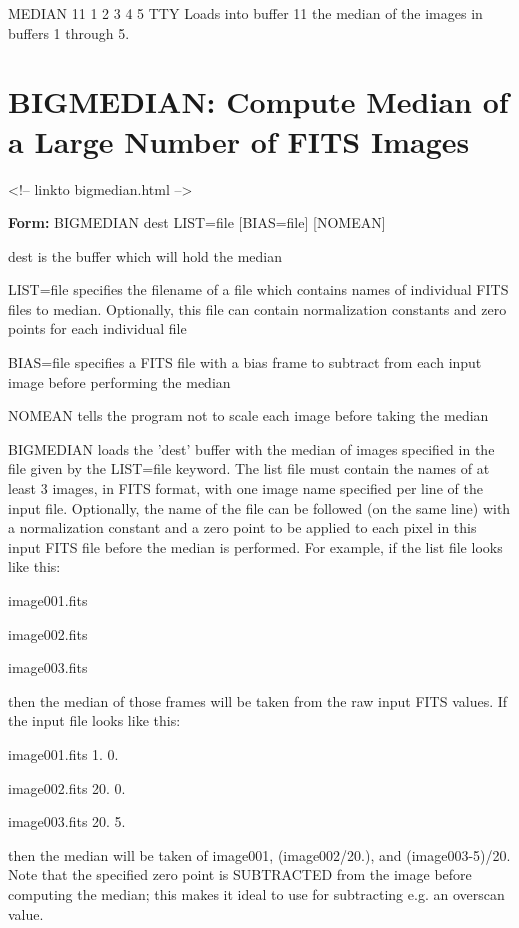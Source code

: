 \begin{example}
  \item[MEDIAN 11 1 2 3 4 5 TTY\hfill]{Loads into buffer 11 the median 
       of the images in buffers 1 through 5.}
\end{example}

\section{BIGMEDIAN: Compute Median of a Large Number of FITS Images}
\begin{rawhtml}
<!-- linkto bigmedian.html -->
\end{rawhtml}

\begin{command}
  \item[\textbf{Form: }BIGMEDIAN dest LIST=file {[BIAS=file]} 
       {[NOMEAN]}\hfill]{}
  \item[dest]{is the buffer which will hold the median}
  \item[LIST=file]{specifies the filename of a file which contains
       names of individual FITS files to median. Optionally,
       this file can contain normalization constants and
       zero points for each individual file}
  \item[BIAS=file]{specifies a FITS file with a bias frame to subtract
       from each input image before performing the median}
  \item[NOMEAN]{tells the program not to scale each image 
       before taking the median}
\end{command}

BIGMEDIAN loads the 'dest' buffer with the median of images specified in
the file given by the LIST=file keyword. The list file must contain the
names of at least 3 images, in FITS format, with one image name specified
per line of the input file. Optionally, the name of the file can be
followed (on the same line) with a normalization constant and a zero point
to be applied to each pixel in this input FITS file before the median is
performed. For example, if the list file looks like this:
\begin{hanging}
  \item{image001.fits}
  \item{image002.fits}
  \item{image003.fits}
\end{hanging}
then the median of those frames will be taken from the raw input FITS
values.  If the input file looks like this:
\begin{hanging}
  \item{image001.fits    1.   0.}
  \item{image002.fits   20.   0.}
  \item{image003.fits   20.   5.}
\end{hanging}
then the median will be taken of image001, (image002/20.), and
(image003-5)/20.  Note that the specified zero point is SUBTRACTED from the
image before computing the median; this makes it ideal to use for subtracting e.g. an
overscan value.

